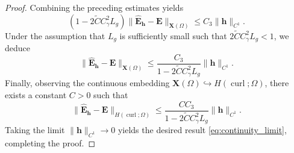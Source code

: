 \documentclass[10pt,a4paper]{amsart}
\numberwithin{equation}{section}
\begin{document}
\begin{proof}
Combining the preceding estimates yields
\[
\left( 1 - 2\widetilde{C} C_\gamma^2 L_g \right) \|\hat{\mathbf{E}}_{\mathbf{h}} - \mathbf{E}\|_{\mathbf{X}(\Omega)} \le C_3 \|\mathbf{h}\|_{C^1}.
\]
Under the assumption that $L_g$ is sufficiently small such that $2\widetilde{C} C_\gamma^2 L_g < 1$, we deduce
\[
\|\hat{\mathbf{E}}_{\mathbf{h}} - \mathbf{E}\|_{\mathbf{X}(\Omega)} \le \frac{C_3}{1 - 2\widetilde{C} C_\gamma^2 L_g} \|\mathbf{h}\|_{C^1}.
\]
Finally, observing the continuous embedding $\mathbf{X}(\Omega) \hookrightarrow H(\operatorname{curl}; \Omega)$, there exists a constant $C > 0$ such that
\[
\|\hat{\mathbf{E}}_{\mathbf{h}} - \mathbf{E}\|_{H(\operatorname{curl}; \Omega)} \le \frac{C C_3}{1 - 2\widetilde{C} C_\gamma^2 L_g} \|\mathbf{h}\|_{C^1}.
\]
Taking the limit $\|\mathbf{h}\|_{C^1} \to 0$ yields the desired result \eqref{eq:continuity_limit}, completing the proof.




\end{proof}
\end{document}
